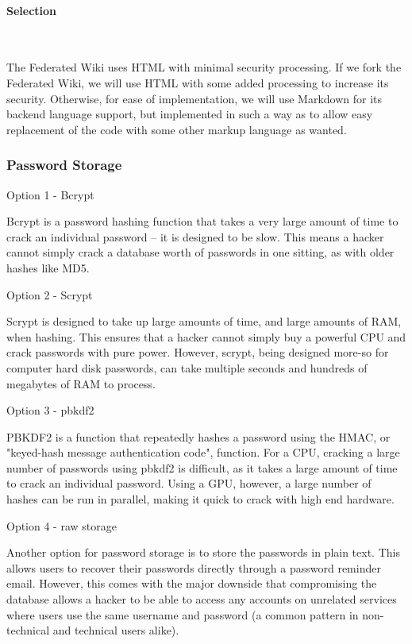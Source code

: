 \documentclass[letterpaper, 10pt, draftclsnofoot, compsoc, onecolumn]{IEEEtran}
\begin{document}
{\medskip
\paragraph{Selection} ~\\
{\noindent
The Federated Wiki uses HTML with minimal security processing. If we fork the Federated Wiki, we will use
HTML with some added processing to increase its security. Otherwise, for ease of implementation, we will
use Markdown for its backend language support, but implemented in such a way as to allow easy
replacement of the code with some other markup language as wanted.
\par}

\newpage
\medskip
\subsubsection{Password Storage}
{\noindent \par}
{\noindent Option 1 - Bcrypt \par}
{\noindent Bcrypt is a password hashing function that takes a very large amount of time to crack
an individual password -- it is designed to be slow. This means a hacker cannot simply crack
a database worth of passwords in one sitting, as with older hashes like MD5. \par}
{\noindent Option 2 - Scrypt \par}
{\noindent Scrypt is designed to take up large amounts of time, and large amounts of RAM,
when hashing. This ensures that a hacker cannot simply buy a powerful CPU and crack passwords with
pure power. However, scrypt, being designed more-so for computer hard disk passwords, can take
multiple seconds and hundreds of megabytes of RAM to process. \par}
{\noindent Option 3 - pbkdf2 \par}
{\noindent PBKDF2 is a function that repeatedly hashes a password using the HMAC, or "keyed-hash
message authentication code", function. For a CPU, cracking a large number of passwords using pbkdf2
is difficult, as it takes a large amount of time to crack an individual password. Using a GPU,
however, a large number of hashes can be run in parallel, making it quick to crack with high end hardware. \par}
{\noindent Option 4 - raw storage \par}
{\noindent Another option for password storage is to store the passwords in plain text. This allows
users to recover their passwords directly through a password reminder email. However, this comes with
the major downside that compromising the database allows a hacker to be able to access any
accounts on unrelated services where users use the same username and password (a common pattern
in non-technical and technical users alike). \par}

}
\end{document}
